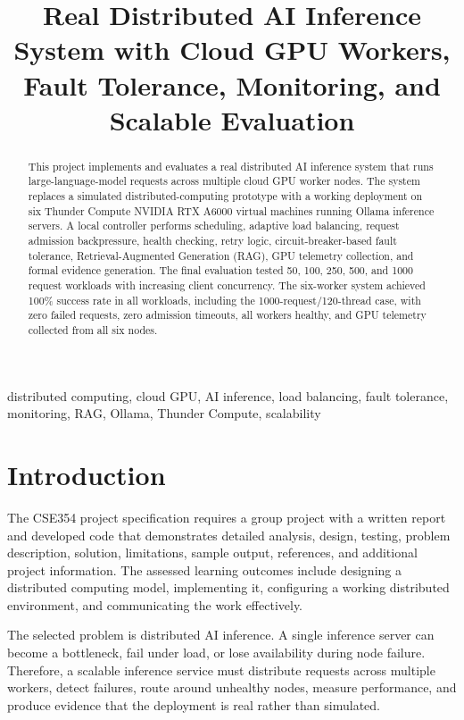 \documentclass[conference]{IEEEtran}
\title{Real Distributed AI Inference System with Cloud GPU Workers, Fault Tolerance, Monitoring, and Scalable Evaluation}
\author{
\IEEEauthorblockN{Boulos Aziz, [Team Member Names]}
\IEEEauthorblockA{CSE354 Distributed Computing\\
Ain Shams University, Faculty of Engineering\\
Spring 2025/2026}
}
\begin{document}
\maketitle

\begin{abstract}
This project implements and evaluates a real distributed AI inference system that runs large-language-model requests across multiple cloud GPU worker nodes. The system replaces a simulated distributed-computing prototype with a working deployment on six Thunder Compute NVIDIA RTX A6000 virtual machines running Ollama inference servers. A local controller performs scheduling, adaptive load balancing, request admission backpressure, health checking, retry logic, circuit-breaker-based fault tolerance, Retrieval-Augmented Generation (RAG), GPU telemetry collection, and formal evidence generation. The final evaluation tested 50, 100, 250, 500, and 1000 request workloads with increasing client concurrency. The six-worker system achieved 100\% success rate in all workloads, including the 1000-request/120-thread case, with zero failed requests, zero admission timeouts, all workers healthy, and GPU telemetry collected from all six nodes.
\end{abstract}

\begin{IEEEkeywords}
distributed computing, cloud GPU, AI inference, load balancing, fault tolerance, monitoring, RAG, Ollama, Thunder Compute, scalability
\end{IEEEkeywords}

\section{Introduction}
The CSE354 project specification requires a group project with a written report and developed code that demonstrates detailed analysis, design, testing, problem description, solution, limitations, sample output, references, and additional project information. The assessed learning outcomes include designing a distributed computing model, implementing it, configuring a working distributed environment, and communicating the work effectively.

The selected problem is distributed AI inference. A single inference server can become a bottleneck, fail under load, or lose availability during node failure. Therefore, a scalable inference service must distribute requests across multiple workers, detect failures, route around unhealthy nodes, measure performance, and produce evidence that the deployment is real rather than simulated.
\end{document}
